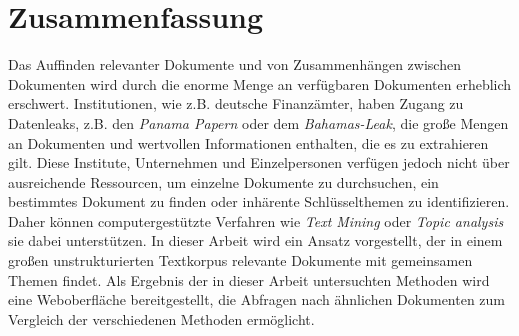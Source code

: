 \chapter*{Zusammenfassung}

Das Auffinden relevanter Dokumente und von Zusammenhängen zwischen Dokumenten wird durch die enorme Menge an verfügbaren Dokumenten erheblich erschwert.
Institutionen, wie z.B. deutsche Finanzämter, haben Zugang zu Datenleaks, z.B. den \textit{Panama Papern} oder dem \textit{Bahamas-Leak}, 
die große Mengen an Dokumenten und wertvollen Informationen enthalten, die es zu extrahieren gilt.
Diese Institute, Unternehmen und Einzelpersonen verfügen jedoch nicht über ausreichende Ressourcen, um einzelne Dokumente 
zu durchsuchen, ein bestimmtes Dokument zu finden oder inhärente Schlüsselthemen zu identifizieren.
Daher können computergestützte Verfahren wie \textit{Text Mining} oder \textit{Topic analysis} sie dabei unterstützen.
In dieser Arbeit wird ein Ansatz vorgestellt, der in einem großen unstrukturierten Textkorpus relevante Dokumente mit gemeinsamen Themen findet.
Als Ergebnis der in dieser Arbeit untersuchten Methoden wird eine Weboberfläche bereitgestellt, die Abfragen nach ähnlichen Dokumenten 
zum Vergleich der verschiedenen Methoden ermöglicht.